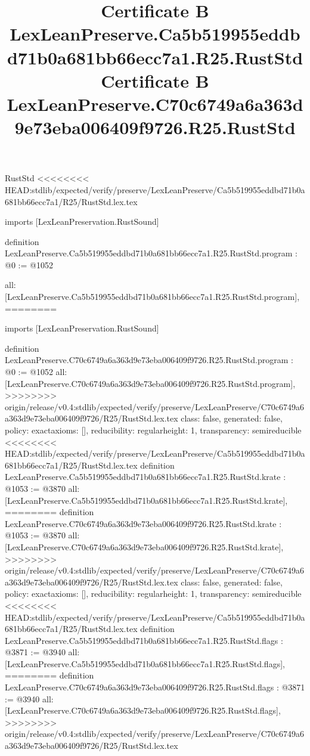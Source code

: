 \begin{lexlean}{RustStd}
<<<<<<<< HEAD:stdlib/expected/verify/preserve/LexLeanPreserve/Ca5b519955eddbd71b0a681bb66ecc7a1/R25/RustStd.lex.tex
\title{Certificate B LexLeanPreserve.Ca5b519955eddbd71b0a681bb66ecc7a1.R25.RustStd}
\begin{coremodule}
imports [LexLeanPreservation.RustSound]

definition LexLeanPreserve.Ca5b519955eddbd71b0a681bb66ecc7a1.R25.RustStd.program : @0 := @1052 {
  all: [LexLeanPreserve.Ca5b519955eddbd71b0a681bb66ecc7a1.R25.RustStd.program],
========
\title{Certificate B LexLeanPreserve.C70c6749a6a363d9e73eba006409f9726.R25.RustStd}
\begin{coremodule}
imports [LexLeanPreservation.RustSound]

definition LexLeanPreserve.C70c6749a6a363d9e73eba006409f9726.R25.RustStd.program : @0 := @1052 {
  all: [LexLeanPreserve.C70c6749a6a363d9e73eba006409f9726.R25.RustStd.program],
>>>>>>>> origin/release/v0.4:stdlib/expected/verify/preserve/LexLeanPreserve/C70c6749a6a363d9e73eba006409f9726/R25/RustStd.lex.tex
  class: false,
  generated: false,
  policy: exact{axioms: []},
  reducibility: regular{height: 1},
  transparency: semireducible
}
<<<<<<<< HEAD:stdlib/expected/verify/preserve/LexLeanPreserve/Ca5b519955eddbd71b0a681bb66ecc7a1/R25/RustStd.lex.tex
definition LexLeanPreserve.Ca5b519955eddbd71b0a681bb66ecc7a1.R25.RustStd.krate : @1053 := @3870 {
  all: [LexLeanPreserve.Ca5b519955eddbd71b0a681bb66ecc7a1.R25.RustStd.krate],
========
definition LexLeanPreserve.C70c6749a6a363d9e73eba006409f9726.R25.RustStd.krate : @1053 := @3870 {
  all: [LexLeanPreserve.C70c6749a6a363d9e73eba006409f9726.R25.RustStd.krate],
>>>>>>>> origin/release/v0.4:stdlib/expected/verify/preserve/LexLeanPreserve/C70c6749a6a363d9e73eba006409f9726/R25/RustStd.lex.tex
  class: false,
  generated: false,
  policy: exact{axioms: []},
  reducibility: regular{height: 1},
  transparency: semireducible
}
<<<<<<<< HEAD:stdlib/expected/verify/preserve/LexLeanPreserve/Ca5b519955eddbd71b0a681bb66ecc7a1/R25/RustStd.lex.tex
definition LexLeanPreserve.Ca5b519955eddbd71b0a681bb66ecc7a1.R25.RustStd.flags : @3871 := @3940 {
  all: [LexLeanPreserve.Ca5b519955eddbd71b0a681bb66ecc7a1.R25.RustStd.flags],
========
definition LexLeanPreserve.C70c6749a6a363d9e73eba006409f9726.R25.RustStd.flags : @3871 := @3940 {
  all: [LexLeanPreserve.C70c6749a6a363d9e73eba006409f9726.R25.RustStd.flags],
>>>>>>>> origin/release/v0.4:stdlib/expected/verify/preserve/LexLeanPreserve/C70c6749a6a363d9e73eba006409f9726/R25/RustStd.lex.tex
}}}
\end{coremodule}}
\end{coremodule}
\end{lexlean}
